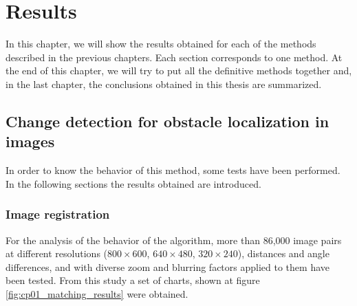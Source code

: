 

\chapter{Results}\label{ch:chapter08}

In this chapter, we will show the results obtained for each of the methods described in the previous chapters. Each section corresponds to one method. At the end of this chapter, we will try to put all the definitive methods together and, in the last chapter, the conclusions obtained in this thesis are summarized.

\graphicspath{{./images/chapter01/bmps/}{./images/chapter01/vects/}{./images/chapter01/}}
\section{Change detection for obstacle localization in images}\label{ch:chapter01_02}

In order to know the behavior of this method, some tests have been performed. In the following sections the results obtained are introduced.

\subsection{Image registration}\label{ch:chapter01_02_01}

For the analysis of the behavior of the algorithm, more than 86,000 image pairs at different resolutions ($800 \times 600$, $640 \times 480$, $320 \times 240$), distances and angle differences, and with diverse zoom and blurring factors applied to them have been tested. From this study a set of charts, shown at figure \ref{fig:cp01_matching_results} were obtained.

